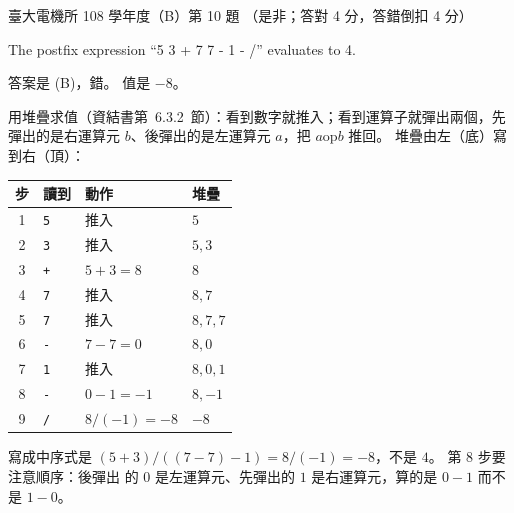\begin{pastexam}[label={px:ntu-108-ee-dsb-10}]{臺大電機所 108 學年度（B）第 10 題}
（是非；答對 4 分，答錯倒扣 4 分）

The postfix expression ``5 3 + 7 7 - 1 - /'' evaluates to 4.
\end{pastexam}

\begin{pastsoln}
答案是 (B)，錯。 值是 $-8$。

用堆疊求值（資結書第~6.3.2~節）：看到數字就推入；看到運算子就彈出兩個，先彈出的是右運算元
$b$、後彈出的是左運算元 $a$，把 $a \mathbin{\mathrm{op}} b$ 推回。 堆疊由左（底）寫到右（頂）：
\begin{center}
\begin{tabular}{clll}
\toprule
步 & 讀到 & 動作 & 堆疊 \\
\midrule
1 & \texttt{5} & 推入 & $5$ \\
2 & \texttt{3} & 推入 & $5, 3$ \\
3 & \texttt{+} & $5 + 3 = 8$ & $8$ \\
4 & \texttt{7} & 推入 & $8, 7$ \\
5 & \texttt{7} & 推入 & $8, 7, 7$ \\
6 & \texttt{-} & $7 - 7 = 0$ & $8, 0$ \\
7 & \texttt{1} & 推入 & $8, 0, 1$ \\
8 & \texttt{-} & $0 - 1 = -1$ & $8, -1$ \\
9 & \texttt{/} & $8 / (-1) = -8$ & $-8$ \\
\bottomrule
\end{tabular}
\end{center}
寫成中序式是 $(5 + 3) / ((7 - 7) - 1) = 8 / (-1) = -8$，不是 $4$。 第 8 步要注意順序：後彈出
的 $0$ 是左運算元、先彈出的 $1$ 是右運算元，算的是 $0 - 1$ 而不是 $1 - 0$。
\end{pastsoln}
